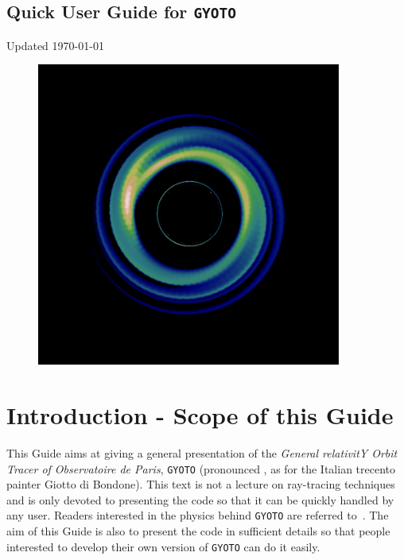 \documentclass[a4paper,12pt]{article}
\begin{document}
\begin{center}
\section*{\Huge{Quick User Guide for \texttt{GYOTO}}}

\vspace{0.5cm}

\Large{Updated}
\today

\vspace{4cm}

\begin{figure}[htbp]
\centering
\includegraphics[width=10cm,height=10cm]{RWI_t1822_nu18.pdf}
\end{figure}

\end{center}



\newpage

\section*{Introduction - Scope of this Guide}

This Guide aims at giving a general presentation of the \textit{General relativitY Orbit Tracer of Observatoire de Paris}, \texttt{GYOTO} (pronounced \textipa{[dZIoto]}, as for the Italian trecento painter Giotto di Bondone). This text is not a lecture on ray-tracing techniques and is only devoted to presenting the code so that it can be quickly handled by any user. Readers interested in the physics behind \texttt{GYOTO} are referred to~\citet[][and references therein]{vincent11a,vincent12a}. The aim of this Guide is also to present the code in sufficient details so that people interested to develop their own version of \texttt{GYOTO} can do it easily.
\end{document}
